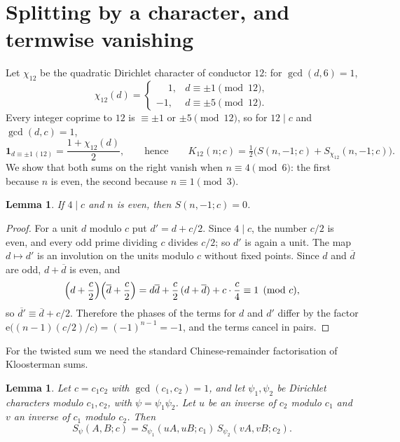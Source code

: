 \documentclass[11pt]{amsart}
\numberwithin{equation}{section}
\newtheorem{lemma}[theorem]{Lemma}
\theoremstyle{definition}
\theoremstyle{remark}
\newcommand{\e}{\mathrm{e}}
\newcommand{\inv}[1]{\overline{#1}}
\begin{document}
\section{Splitting by a character, and termwise vanishing}\label{sec:vanish}

Let $\chi_{12}$ be the quadratic Dirichlet character of conductor $12$: for $\gcd(d,6)=1$,
\[
\chi_{12}(d)=\begin{cases}\phantom{-}1,& d\equiv\pm1\pmod{12},\\-1,& d\equiv\pm5\pmod{12}.\end{cases}
\]
Every integer coprime to $12$ is $\equiv\pm1$ or $\pm5\pmod{12}$, so for $12\mid c$ and $\gcd(d,c)=1$,
\begin{equation}\label{eq:indicator}
\mathbf 1_{d\equiv\pm1\,(12)}=\frac{1+\chi_{12}(d)}{2},
\qquad\text{hence}\qquad
K_{12}(n;c)=\tfrac12\bigl(S(n,-1;c)+S_{\chi_{12}}(n,-1;c)\bigr).
\end{equation}
We show that both sums on the right vanish when $n\equiv4\pmod6$: the first because $n$ is even, the second because $n\equiv1\pmod3$.

\begin{lemma}\label{lem:untwisted}
If $4\mid c$ and $n$ is even, then $S(n,-1;c)=0$.
\end{lemma}

\begin{proof}
For a unit $d$ modulo $c$ put $d'=d+c/2$. Since $4\mid c$, the number $c/2$ is even, and every odd prime dividing $c$ divides $c/2$; so $d'$ is again a unit. The map $d\mapsto d'$ is an involution on the units modulo $c$ without fixed points. Since $d$ and $\inv d$ are odd, $d+\inv d$ is even, and
\[
\Bigl(d+\frac c2\Bigr)\Bigl(\inv d+\frac c2\Bigr)=d\inv d+\frac c2\,(d+\inv d)+c\cdot\frac c4\equiv1\pmod c,
\]
so $\inv{d'}\equiv\inv d+c/2$. Therefore the phases of the terms for $d$ and $d'$ differ by the factor $\e\bigl((n-1)(c/2)/c\bigr)=(-1)^{n-1}=-1$, and the terms cancel in pairs.
\end{proof}

For the twisted sum we need the standard Chinese-remainder factorisation of Kloosterman sums.

\begin{lemma}\label{lem:crt}
Let $c=c_1c_2$ with $\gcd(c_1,c_2)=1$, and let $\psi_1,\psi_2$ be Dirichlet characters modulo $c_1,c_2$, with $\psi=\psi_1\psi_2$. Let $u$ be an inverse of $c_2$ modulo $c_1$ and $v$ an inverse of $c_1$ modulo $c_2$. Then
\[
S_\psi(A,B;c)=S_{\psi_1}(uA,uB;c_1)\,S_{\psi_2}(vA,vB;c_2).
\]
\end{lemma}
\end{document}
